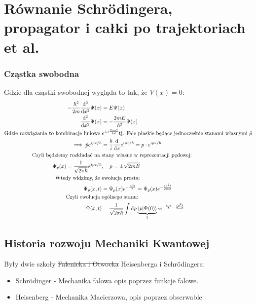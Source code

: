\documentclass[12pt,a4paper]{report}
\newenvironment{lecture}[1]{\par\medskip
   \noindent\chapter{#1} \rmfamily}{\medskip}
\begin{document}
\begin{lecture}{Równanie Schrödingera, propagator i całki po trajektoriach et al.}
\subsection{Cząstka swobodna}
Gdzie dla cząstki swobodnej wygląda to tak, że $V(x) = 0$:
\begin{align*}
    - \frac{\hbar^2}{2m} \dv[2]{x} \Psi(x) &= E \Psi(x)\\
    \dv[2]{x} \Psi(x) &= - \frac{2m E}{\hbar^2} \Psi(x)\\
    \text{Gdzie rozwiązania to kombinacje liniowe  } &e^{\pm i \frac{2 m E}{\hbar^2}} \text{tj. Fale płaskie będące jednocześnie stanami własnymi }\hat{p}\\
    \implies \hat{p} e^{i px/\hbar} &= \frac{\hbar}{i} \dv{x} e^{i p x/ \hbar} = p \cdot e^{i p x / \hbar}\\
    \text{Czyli będziemy rozkładać na } &\text{stany własne w reprezentacji pędowej:}\\
    \Psi_p(x) = \frac{1}{\sqrt{2 \pi \hbar}} e^{i p x /\hbar} &\qc p = \pm \sqrt{2 m E}\\
    \text{Wtedy widzimy, że }&\text{ewolucja prosta:}\\
    \Psi_p(x, t) &= \Psi_p(x) e^{- \frac{i E t}{\hbar}} = \Psi_p(x) e^{- \frac{i p^2 t}{2 m \hbar}} \\
    \text{Czyli ewolucja }&\text{ogólnego stanu:}\\
    \Psi(x,t) &= \frac{1}{\sqrt{2 \pi \hbar}} \int \dd{p} \underbrace{\braket{p}{\Psi(0)}}_{\footnotemark} \cdot e^{- \frac{i p x}{\hbar} - \frac{i p^2 t}{2 m \hbar}}
\end{align*}

\section{Historia rozwoju Mechaniki Kwantowej}
Były dwie szkoły \sout{Falenicka i Otwocka} Heisenberga i Schrödingera:
\begin{itemize}
    \item Schrödinger - Mechanika falowa opis poprzez funkcje falowe.
    \item Heisenberg - Mechanika Macierzowa, opis poprzez obserwable
\end{itemize}

\end{lecture}
\end{document}

